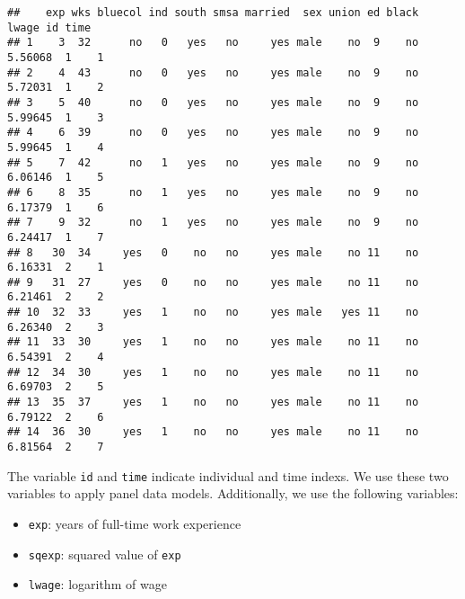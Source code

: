 \documentclass[
  12pt,
]{article}
\newenvironment{Shaded}{\begin{snugshade}}{\end{snugshade}}
\newcommand{\DecValTok}[1]{\textcolor[rgb]{0.00,0.00,0.81}{#1}}
\newcommand{\KeywordTok}[1]{\textcolor[rgb]{0.13,0.29,0.53}{\textbf{#1}}}
\newcommand{\NormalTok}[1]{#1}
\newcommand{\OperatorTok}[1]{\textcolor[rgb]{0.81,0.36,0.00}{\textbf{#1}}}
\newcommand{\StringTok}[1]{\textcolor[rgb]{0.31,0.60,0.02}{#1}}
\providecommand{\tightlist}{%
  \setlength{\itemsep}{0pt}\setlength{\parskip}{0pt}}
\begin{document}
\begin{verbatim}
##    exp wks bluecol ind south smsa married  sex union ed black   lwage id time
## 1    3  32      no   0   yes   no     yes male    no  9    no 5.56068  1    1
## 2    4  43      no   0   yes   no     yes male    no  9    no 5.72031  1    2
## 3    5  40      no   0   yes   no     yes male    no  9    no 5.99645  1    3
## 4    6  39      no   0   yes   no     yes male    no  9    no 5.99645  1    4
## 5    7  42      no   1   yes   no     yes male    no  9    no 6.06146  1    5
## 6    8  35      no   1   yes   no     yes male    no  9    no 6.17379  1    6
## 7    9  32      no   1   yes   no     yes male    no  9    no 6.24417  1    7
## 8   30  34     yes   0    no   no     yes male    no 11    no 6.16331  2    1
## 9   31  27     yes   0    no   no     yes male    no 11    no 6.21461  2    2
## 10  32  33     yes   1    no   no     yes male   yes 11    no 6.26340  2    3
## 11  33  30     yes   1    no   no     yes male    no 11    no 6.54391  2    4
## 12  34  30     yes   1    no   no     yes male    no 11    no 6.69703  2    5
## 13  35  37     yes   1    no   no     yes male    no 11    no 6.79122  2    6
## 14  36  30     yes   1    no   no     yes male    no 11    no 6.81564  2    7
\end{verbatim}

The variable \texttt{id} and \texttt{time} indicate individual and time indexs.
We use these two variables to apply panel data models.
Additionally, we use the following variables:

\begin{itemize}
\tightlist
\item
  \texttt{exp}: years of full-time work experience
\item
  \texttt{sqexp}: squared value of \texttt{exp}
\item
  \texttt{lwage}: logarithm of wage
\end{itemize}

\begin{Shaded}
\end{Shaded}
\end{document}
